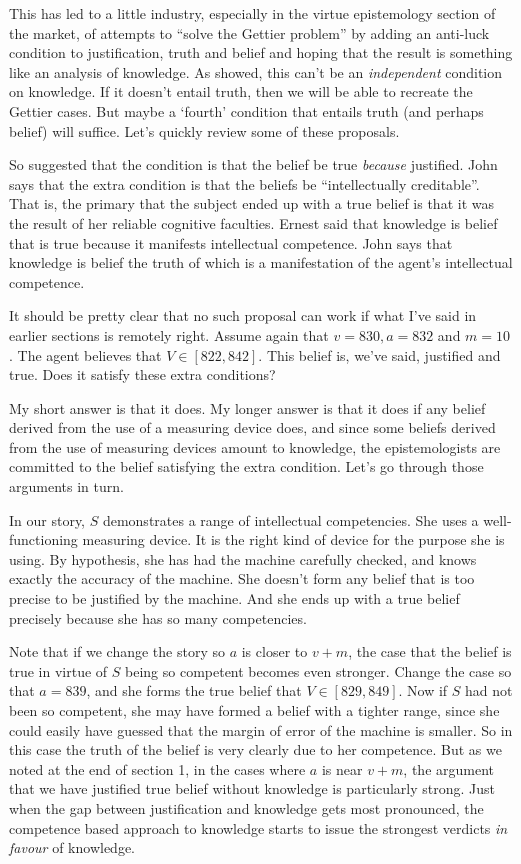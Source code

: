 This has led to a little industry, especially in the virtue epistemology section of the market, of attempts to ``solve the Gettier problem'' by adding an anti-luck condition to justification, truth and belief and hoping that the result is something like an analysis of knowledge. As  \cite{Zagzebski1994} showed, this can't be an \textit{independent} condition on knowledge. If it doesn't entail truth, then we will be able to recreate the Gettier cases. But maybe a `fourth' condition that entails truth (and perhaps belief) will suffice. Let's quickly review some of these proposals. 

So \cite{Zagzebski1996} suggested that the condition is that the belief be true \textit{because} justified. John \cite{Greco2010} says that the extra condition is that the beliefs be ``intellectually creditable''. That is, the primary that the subject ended up with a true belief is that it was the result of her reliable cognitive faculties. Ernest \cite{Sosa2007} said that knowledge is belief that is true because it manifests intellectual competence. John \cite{Turri2011} says that knowledge is belief the truth of which is a manifestation of the agent's intellectual competence.

It should be pretty clear that no such proposal can work if what I've said in earlier sections is remotely right. Assume again that $v = 830, a = 832$ and $m = 10$. The agent believes that $V \in [822, 842]$. This belief is, we've said, justified and true. Does it satisfy these extra conditions?

My short answer is that it does. My longer answer is that it does if any belief derived from the use of a measuring device does, and since some beliefs derived from the use of measuring devices amount to knowledge, the epistemologists are committed to the belief satisfying the extra condition. Let's go through those arguments in turn.

In our story, $S$ demonstrates a range of intellectual competencies. She uses a well-functioning measuring device. It is the right kind of device for the purpose she is using. By hypothesis, she has had the machine carefully checked, and knows exactly the accuracy of the machine. She doesn't form any belief that is too precise to be justified by the machine. And she ends up with a true belief precisely because she has so many competencies.

Note that if we change the story so $a$ is closer to $v + m$, the case that the belief is true in virtue of $S$ being so competent becomes even stronger. Change the case so that $a = 839$, and she forms the true belief that $V \in [829, 849]$. Now if $S$ had not been so competent, she may have formed a belief with a tighter range, since she could easily have guessed that the margin of error of the machine is smaller. So in this case the truth of the belief is very clearly due to her competence. But as we noted at the end of section 1, in the cases where $a$ is near $v + m$, the argument that we have justified true belief without knowledge is particularly strong. Just when the gap between justification and knowledge gets most pronounced, the competence based approach to knowledge starts to issue the strongest verdicts \textit{in favour} of knowledge.

